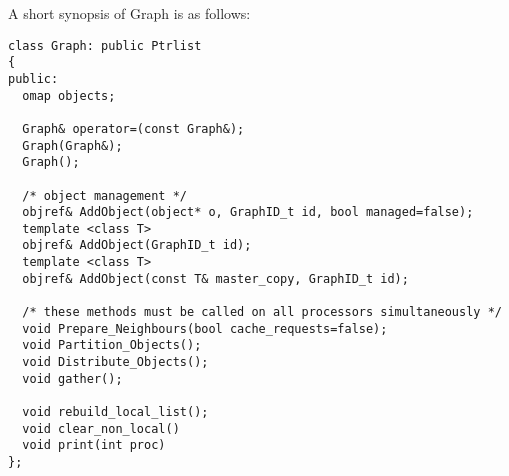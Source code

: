 A short synopsis of Graph is as follows:
\begin{verbatim}
class Graph: public Ptrlist
{
public:
  omap objects;

  Graph& operator=(const Graph&);
  Graph(Graph&);
  Graph();

  /* object management */
  objref& AddObject(object* o, GraphID_t id, bool managed=false); 
  template <class T>
  objref& AddObject(GraphID_t id); 
  template <class T>
  objref& AddObject(const T& master_copy, GraphID_t id); 

  /* these methods must be called on all processors simultaneously */
  void Prepare_Neighbours(bool cache_requests=false);
  void Partition_Objects();
  void Distribute_Objects();
  void gather();

  void rebuild_local_list();   
  void clear_non_local()
  void print(int proc) 
};                 

\end{verbatim}



